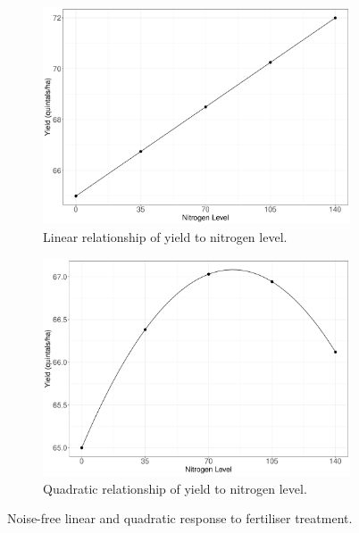 \documentclass[a4paper]{article} 	%
\begin{document}
\begin{figure}[H]
	\begin{subfigure}[t]{0.45\textwidth}
		\centering
		\includegraphics[width=\linewidth]{Expt/LinlinesV2.pdf}
		\caption{Linear relationship of yield to nitrogen level.}
	\end{subfigure}
	\hspace{0.05\textwidth}
	\begin{subfigure}[t]{0.45\textwidth}
		\centering
		\includegraphics[width=\linewidth]{Expt/QualinesV2.pdf}
		\caption{Quadratic relationship of yield to nitrogen level.}
	\end{subfigure}
	\caption{Noise-free linear and quadratic response to fertiliser treatment.}\label{fig:Lines}
\end{figure}
\end{document}
